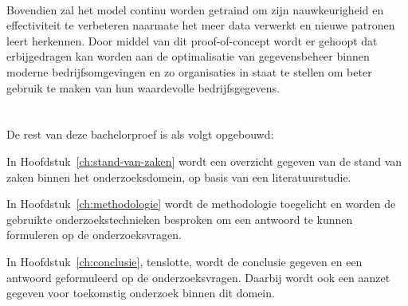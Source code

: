 \\
Bovendien zal het model continu worden getraind om zijn nauwkeurigheid en effectiviteit te verbeteren naarmate het meer data verwerkt en nieuwe patronen leert herkennen. Door middel van dit proof-of-concept wordt er gehoopt dat erbijgedragen kan worden aan de optimalisatie van gegevensbeheer binnen moderne bedrijfsomgevingen en zo organisaties in staat te stellen om beter gebruik te maken van hun waardevolle bedrijfsgegevens.

\section{}%
\label{sec:opzet-bachelorproef}


De rest van deze bachelorproef is als volgt opgebouwd:

In Hoofdstuk~\ref{ch:stand-van-zaken} wordt een overzicht gegeven van de stand van zaken binnen het onderzoeksdomein, op basis van een literatuurstudie.

In Hoofdstuk~\ref{ch:methodologie} wordt de methodologie toegelicht en worden de gebruikte onderzoekstechnieken besproken om een antwoord te kunnen formuleren op de onderzoeksvragen.


In Hoofdstuk~\ref{ch:conclusie}, tenslotte, wordt de conclusie gegeven en een antwoord geformuleerd op de onderzoeksvragen. Daarbij wordt ook een aanzet gegeven voor toekomstig onderzoek binnen dit domein.